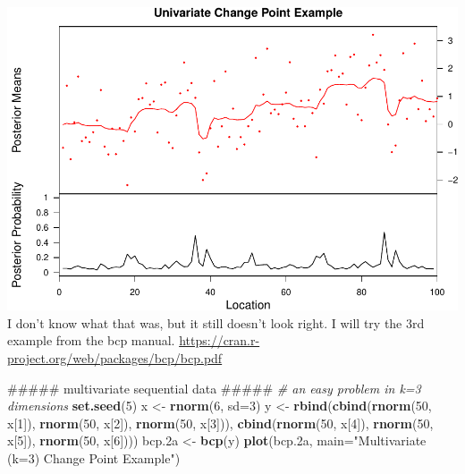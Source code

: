 \documentclass[]{article}
\newenvironment{Shaded}{\begin{snugshade}}{\end{snugshade}}
\newcommand{\KeywordTok}[1]{\textcolor[rgb]{0.13,0.29,0.53}{\textbf{{#1}}}}
\newcommand{\DataTypeTok}[1]{\textcolor[rgb]{0.13,0.29,0.53}{{#1}}}
\newcommand{\DecValTok}[1]{\textcolor[rgb]{0.00,0.00,0.81}{{#1}}}
\newcommand{\StringTok}[1]{\textcolor[rgb]{0.31,0.60,0.02}{{#1}}}
\newcommand{\CommentTok}[1]{\textcolor[rgb]{0.56,0.35,0.01}{\textit{{#1}}}}
\newcommand{\NormalTok}[1]{{#1}}
\begin{document}
\includegraphics{rentersAndOwners_files/figure-latex/unnamed-chunk-6-1.pdf}
I don't know what that was, but it still doesn't look right. I will try
the 3rd example from the bcp manual.
\url{https://cran.r-project.org/web/packages/bcp/bcp.pdf}

\begin{Shaded}
\begin{Highlighting}[]
\NormalTok{##### multivariate sequential data #####}
\CommentTok{# an easy problem in k=3 dimensions}
\KeywordTok{set.seed}\NormalTok{(}\DecValTok{5}\NormalTok{)}
\NormalTok{x <-}\StringTok{ }\KeywordTok{rnorm}\NormalTok{(}\DecValTok{6}\NormalTok{, }\DataTypeTok{sd=}\DecValTok{3}\NormalTok{)}
\NormalTok{y <-}\StringTok{ }\KeywordTok{rbind}\NormalTok{(}\KeywordTok{cbind}\NormalTok{(}\KeywordTok{rnorm}\NormalTok{(}\DecValTok{50}\NormalTok{, x[}\DecValTok{1}\NormalTok{]), }\KeywordTok{rnorm}\NormalTok{(}\DecValTok{50}\NormalTok{, x[}\DecValTok{2}\NormalTok{]), }\KeywordTok{rnorm}\NormalTok{(}\DecValTok{50}\NormalTok{, x[}\DecValTok{3}\NormalTok{])),}
\KeywordTok{cbind}\NormalTok{(}\KeywordTok{rnorm}\NormalTok{(}\DecValTok{50}\NormalTok{, x[}\DecValTok{4}\NormalTok{]), }\KeywordTok{rnorm}\NormalTok{(}\DecValTok{50}\NormalTok{, x[}\DecValTok{5}\NormalTok{]), }\KeywordTok{rnorm}\NormalTok{(}\DecValTok{50}\NormalTok{, x[}\DecValTok{6}\NormalTok{])))}
\NormalTok{bcp.2a <-}\StringTok{ }\KeywordTok{bcp}\NormalTok{(y)}
\KeywordTok{plot}\NormalTok{(bcp.2a, }\DataTypeTok{main=}\StringTok{"Multivariate (k=3) Change Point Example"}\NormalTok{)}
\end{Highlighting}
\end{Shaded}
\end{document}

